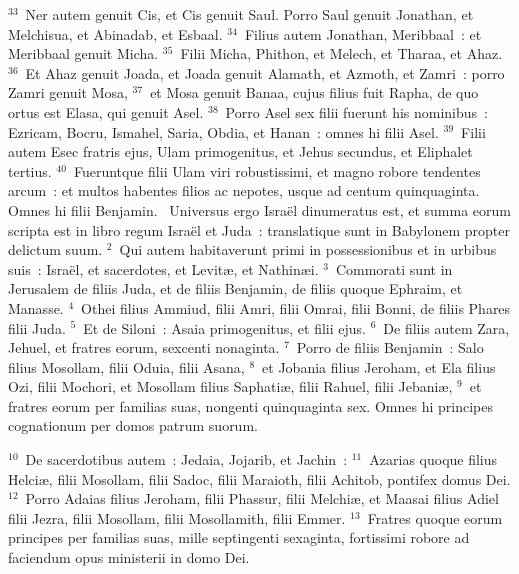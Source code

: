 ${}^{33}$~Ner autem genuit Cis, et Cis genuit Saul. Porro Saul genuit Jonathan, et Melchisua, et Abinadab, et Esbaal.
${}^{34}$~Filius autem Jonathan, Meribbaal~: et Meribbaal genuit Micha.
${}^{35}$~Filii Micha, Phithon, et Melech, et Tharaa, et Ahaz.
${}^{36}$~Et Ahaz genuit Joada, et Joada genuit Alamath, et Azmoth, et Zamri~: porro Zamri genuit Mosa,
${}^{37}$~et Mosa genuit Banaa, cujus filius fuit Rapha, de quo ortus est Elasa, qui genuit Asel.
${}^{38}$~Porro Asel sex filii fuerunt his nominibus~: Ezricam, Bocru, Ismahel, Saria, Obdia, et Hanan~: omnes hi filii Asel.
${}^{39}$~Filii autem Esec fratris ejus, Ulam primogenitus, et Jehus secundus, et Eliphalet tertius.
${}^{40}$~Fueruntque filii Ulam viri robustissimi, et magno robore tendentes arcum~: et multos habentes filios ac nepotes, usque ad centum quinquaginta. Omnes hi filii Benjamin.
~Universus ergo Isra\"el dinumeratus est, et summa eorum scripta est in libro regum Isra\"el et Juda~: translatique sunt in Babylonem propter delictum suum.
${}^{2}$~Qui autem habitaverunt primi in possessionibus et in urbibus suis~: Isra\"el, et sacerdotes, et Levit\ae , et Nathin\ae i.
${}^{3}$~Commorati sunt in Jerusalem de filiis Juda, et de filiis Benjamin, de filiis quoque Ephraim, et Manasse.
${}^{4}$~Othei filius Ammiud, filii Amri, filii Omrai, filii Bonni, de filiis Phares filii Juda.
${}^{5}$~Et de Siloni~: Asaia primogenitus, et filii ejus.
${}^{6}$~De filiis autem Zara, Jehuel, et fratres eorum, sexcenti nonaginta.
${}^{7}$~Porro de filiis Benjamin~: Salo filius Mosollam, filii Oduia, filii Asana,
${}^{8}$~et Jobania filius Jeroham, et Ela filius Ozi, filii Mochori, et Mosollam filius Saphati\ae , filii Rahuel, filii Jebani\ae ,
${}^{9}$~et fratres eorum per familias suas, nongenti quinquaginta sex. Omnes hi principes cognationum per domos patrum suorum.


${}^{10}$~De sacerdotibus autem~: Jedaia, Jojarib, et Jachin~:
${}^{11}$~Azarias quoque filius Helci\ae , filii Mosollam, filii Sadoc, filii Maraioth, filii Achitob, pontifex domus Dei.
${}^{12}$~Porro Adaias filius Jeroham, filii Phassur, filii Melchi\ae , et Maasai filius Adiel filii Jezra, filii Mosollam, filii Mosollamith, filii Emmer.
${}^{13}$~Fratres quoque eorum principes per familias suas, mille septingenti sexaginta, fortissimi robore ad faciendum opus ministerii in domo Dei.


